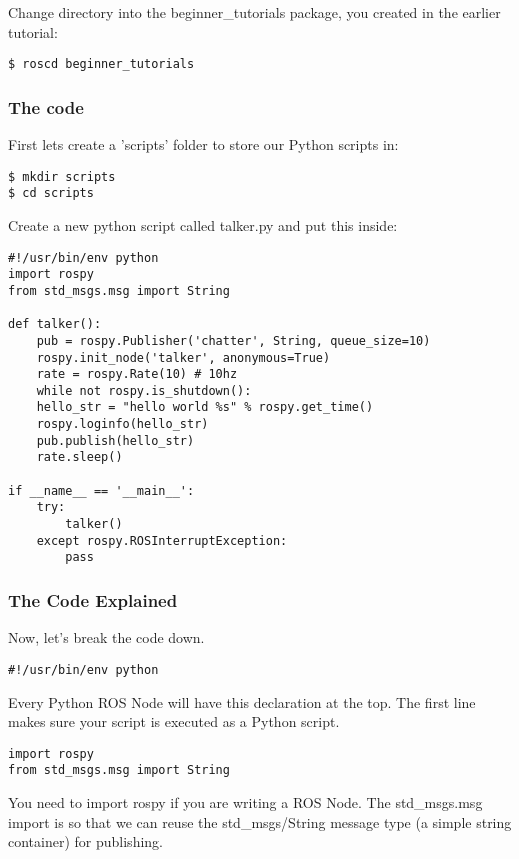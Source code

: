 Change directory into the beginner\_tutorials package, you created in the earlier tutorial:

\begin{lstlisting}[breaklines=true languages=bash]
$ roscd beginner_tutorials
\end{lstlisting}

\subsubsection{The code}
First lets create a 'scripts' folder to store our Python scripts in:

\begin{lstlisting}[breaklines=true languages=bash]
$ mkdir scripts
$ cd scripts
\end{lstlisting}

Create a new python script called talker.py and put this inside:

\begin{lstlisting}[breaklines=true languages=python]
#!/usr/bin/env python
import rospy
from std_msgs.msg import String

def talker():
	pub = rospy.Publisher('chatter', String, queue_size=10)
	rospy.init_node('talker', anonymous=True)
	rate = rospy.Rate(10) # 10hz
	while not rospy.is_shutdown():
	hello_str = "hello world %s" % rospy.get_time()
	rospy.loginfo(hello_str)
	pub.publish(hello_str)
	rate.sleep()

if __name__ == '__main__':
	try:
		talker()
	except rospy.ROSInterruptException:
		pass
\end{lstlisting}

\subsubsection{The Code Explained}
Now, let's break the code down.

\begin{lstlisting}[breaklines=true languages=python]
#!/usr/bin/env python
\end{lstlisting}

Every Python ROS Node will have this declaration at the top. The first line makes sure your script is executed as a Python script.

\begin{lstlisting}[breaklines=true languages=python]
import rospy
from std_msgs.msg import String
\end{lstlisting}

You need to import rospy if you are writing a ROS Node. The std\_msgs.msg import is so that we can reuse the std\_msgs/String message type (a simple string container) for publishing.

